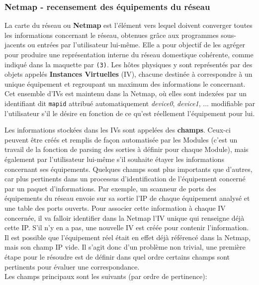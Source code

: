 \documentclass[]{article}
\begin{document}
\newpage

\subsubsection{Netmap - recensement des équipements du réseau}

La carte du réseau ou \textbf{Netmap} est l'élément vers lequel doivent converger toutes les informations concernant le réseau, obtenues grâce aux programmes sous-jacents ou entrées par l'utilisateur lui-même. Elle a pour objectif de les agréger pour produire une représentation interne du réseau domestique cohérente, comme indiqué dans la maquette par \texttt{(3)}. Les hôtes physiques y sont représentés par des objets appelés \textbf{Instances Virtuelles} (IV), chacune destinée à correspondre à un unique équipement et regroupant un maximum des informations le concernant. Cet ensemble d'IVs est maintenu dans la Netmap, où elles sont indexées par un identifiant dit \texttt{mapid} attribué automatiquement \textit{device0}, \textit{device1}, ... modifiable par l'utilisateur s'il le désire en fonction de ce qu'est réellement l'équipement pour lui.\\

\par Les informations stockées dans les IVs sont appelées des \textbf{champs}. Ceux-ci peuvent être créés et remplis de façon automatisée par les Modules (c'est un travail de la fonction de parsing des sorties à définir pour chaque Module), mais également par l'utilisateur lui-même s'il souhaite étayer les informations concernant ses équipements. Quelques champs sont plus importants que d'autres, car plus pertinents dans un processus d'identification de l'équipement concerné par un paquet d'informations. Par exemple, un scanneur de ports des équipements du réseau envoie sur sa sortie l'IP de chaque équipement analysé et une table des ports ouverts. Pour associer cette information à chaque IV concernée, il va falloir identifier dans la Netmap l'IV unique qui renseigne déjà cette IP. S'il n'y en a pas, une nouvelle IV est créée pour contenir l'information. Il est possible que l'équipement réel était en effet déjà référencé dans la Netmap, mais son champ IP vide. Il s'agit donc d'un problème non trivial, une première étape pour le résoudre est de définir dans quel ordre certains champs sont pertinents pour évaluer une correspondance.\\

Les champs principaux sont les suivants (par ordre de pertinence):
\end{document}
